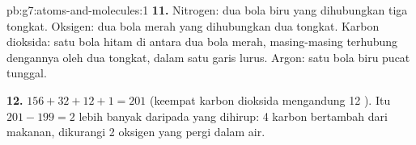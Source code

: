 \begin{solution}{pb:g7:atoms-and-molecules:1}
\textbf{11.} Nitrogen: dua bola biru yang dihubungkan tiga tongkat.
Oksigen: dua bola merah yang dihubungkan dua tongkat. Karbon dioksida:
satu bola hitam di antara dua bola merah, masing-masing terhubung
dengannya oleh dua tongkat, dalam satu garis lurus. Argon: satu bola
biru pucat tunggal.

\textbf{12.} $156 + 32 + 12 + 1 = 201$  (keempat  karbon
dioksida mengandung 12 ). Itu $201 - 199 = 2$  lebih banyak
daripada  yang dihirup: 4  karbon bertambah dari makanan,
dikurangi 2  oksigen yang pergi dalam air.
\end{solution}
